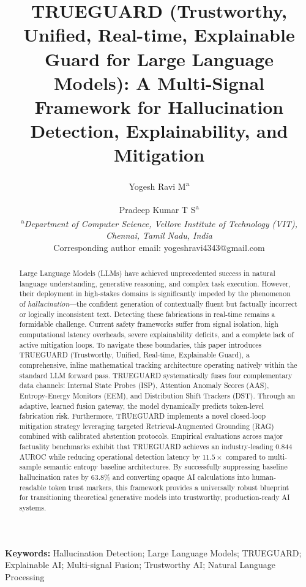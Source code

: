 \documentclass{article}
\title{\textbf{TRUEGUARD (Trustworthy, Unified, Real-time, Explainable Guard for Large Language Models): A Multi-Signal Framework for Hallucination Detection, Explainability, and Mitigation}}
\author{
    Yogesh Ravi M\textsuperscript{a} \and Pradeep Kumar T S\textsuperscript{a} \\[6pt]
    \textsuperscript{a}\textit{Department of Computer Science, Vellore Institute of Technology (VIT),} \\
    \textit{Chennai, Tamil Nadu, India} \\[4pt]
    \small{Corresponding author email: yogeshravi4343@gmail.com}
}
\date{}
\begin{document}
\maketitle

\begin{abstract}
\noindent
Large Language Models (LLMs) have achieved unprecedented success in natural language understanding, generative reasoning, and complex task execution. However, their deployment in high-stakes domains is significantly impeded by the phenomenon of \textit{hallucination}—the confident generation of contextually fluent but factually incorrect or logically inconsistent text. Detecting these fabrications in real-time remains a formidable challenge. Current safety frameworks suffer from signal isolation, high computational latency overheads, severe explainability deficits, and a complete lack of active mitigation loops. To navigate these boundaries, this paper introduces TRUEGUARD (Trustworthy, Unified, Real-time, Explainable Guard), a comprehensive, inline mathematical tracking architecture operating natively within the standard LLM forward pass. TRUEGUARD systematically fuses four complementary data channels: Internal State Probes (ISP), Attention Anomaly Scores (AAS), Entropy-Energy Monitors (EEM), and Distribution Shift Trackers (DST). Through an adaptive, learned fusion gateway, the model dynamically predicts token-level fabrication risk. Furthermore, TRUEGUARD implements a novel closed-loop mitigation strategy leveraging targeted Retrieval-Augmented Grounding (RAG) combined with calibrated abstention protocols. Empirical evaluations across major factuality benchmarks exhibit that TRUEGUARD achieves an industry-leading 0.844 AUROC while reducing operational detection latency by $11.5\times$ compared to multi-sample semantic entropy baseline architectures. By successfully suppressing baseline hallucination rates by $63.8\%$ and converting opaque AI calculations into human-readable token trust markers, this framework provides a universally robust blueprint for transitioning theoretical generative models into trustworthy, production-ready AI systems.
\end{abstract}

\noindent\textbf{Keywords:} Hallucination Detection; Large Language Models; TRUEGUARD; Explainable AI; Multi-signal Fusion; Trustworthy AI; Natural Language Processing
\end{document}
